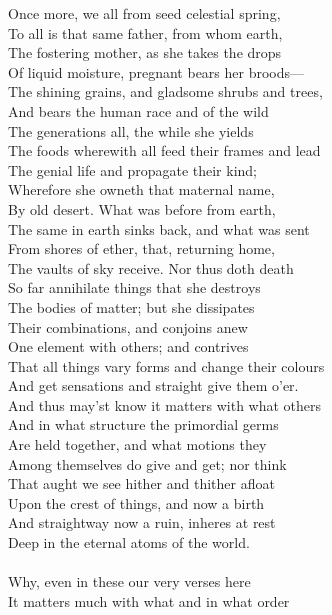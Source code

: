 Once more, we all from seed celestial spring,\\
To all is that same father, from whom earth,\\
The fostering mother, as she takes the drops\\
Of liquid moisture, pregnant bears her broods—\\
The shining grains, and gladsome shrubs and trees,\\
And bears the human race and of the wild\\
The generations all, the while she yields\\
The foods wherewith all feed their frames and lead\\
The genial life and propagate their kind;\\
Wherefore she owneth that maternal name,\\
By old desert. What was before from earth,\\
The same in earth sinks back, and what was sent\\
From shores of ether, that, returning home,\\
The vaults of sky receive. Nor thus doth death\\
So far annihilate things that she destroys\\
The bodies of matter; but she dissipates\\
Their combinations, and conjoins anew\\
One element with others; and contrives\\
That all things vary forms and change their colours\\
And get sensations and straight give them o'er.\\
And thus may'st know it matters with what others\\
And in what structure the primordial germs\\
Are held together, and what motions they\\
Among themselves do give and get; nor think\\
That aught we see hither and thither afloat\\
Upon the crest of things, and now a birth\\
And straightway now a ruin, inheres at rest\\
Deep in the eternal atoms of the world.\\
\\
Why, even in these our very verses here\\
It matters much with what and in what order\\
